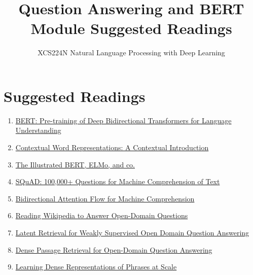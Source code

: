 \documentclass{article}
\title{Question Answering and BERT Module Suggested Readings}
\author{XCS224N Natural Language Processing with Deep Learning}
\date{}
\begin{document}
\maketitle

\section{Suggested Readings}
\begin{enumerate}
    \item \href{https://arxiv.org/pdf/1810.04805.pdf}{BERT: Pre-training of Deep Bidirectional Transformers for Language Understanding}
    \item \href{https://arxiv.org/pdf/1902.06006.pdf}{Contextual Word Representations: A Contextual Introduction}
    \item \href{http://jalammar.github.io/illustrated-bert/}{The Illustrated BERT, ELMo, and co.}
    \item \href{https://arxiv.org/pdf/1606.05250.pdf}{SQuAD: 100,000+ Questions for Machine Comprehension of Text}
    \item \href{https://arxiv.org/pdf/1611.01603.pdf}{Bidirectional Attention Flow for Machine Comprehension}
    \item \href{https://arxiv.org/pdf/1704.00051.pdf}{Reading Wikipedia to Answer Open-Domain Questions}
    \item \href{https://arxiv.org/pdf/1906.00300.pdf}{Latent Retrieval for Weakly Supervised Open Domain Question Answering}
    \item \href{https://arxiv.org/pdf/2004.04906.pdf}{Dense Passage Retrieval for Open-Domain Question Answering}
    \item \href{https://arxiv.org/pdf/2012.12624.pdf}{Learning Dense Representations of Phrases at Scale}
\end{enumerate}
\end{document}

